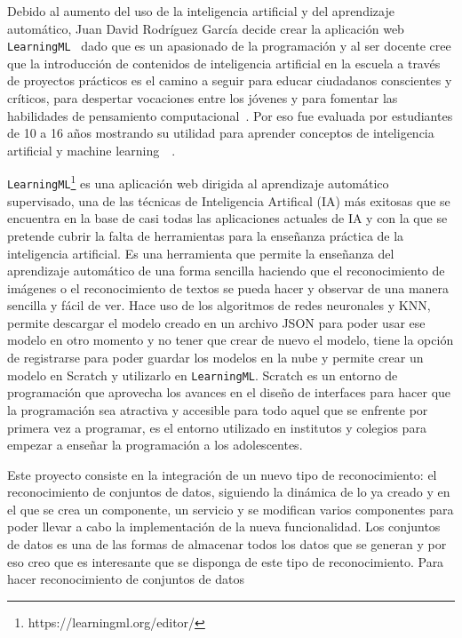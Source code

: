 \documentclass[a4paper, 12pt]{book}
\begin{document}
Debido al aumento del uso de la inteligencia artificial y del aprendizaje automático, Juan David Rodríguez García decide crear la aplicación web \texttt{LearningML}~\cite{garcia2020learningml} dado que es un apasionado de la programación y al ser docente cree  que la introducción de contenidos de inteligencia artificial en la escuela a través de proyectos prácticos es el camino a seguir para educar ciudadanos conscientes y críticos, para despertar vocaciones entre los jóvenes y para fomentar las habilidades de pensamiento computacional~\cite{garcia2019developing}. Por eso fue evaluada por estudiantes de 10 a 16 años mostrando su utilidad para aprender conceptos de inteligencia artificial y machine learning~\cite{Pagina_de_LearningML}~\cite{rodriguez2021evaluation}.

\texttt{LearningML}\footnote{https://learningml.org/editor/} es una aplicación web dirigida al aprendizaje automático supervisado, una de las técnicas de Inteligencia Artifical (IA) más exitosas que se encuentra en la base de casi todas las aplicaciones actuales de IA y con la que se pretende cubrir la falta de herramientas para la enseñanza práctica de la inteligencia artificial. 
Es una herramienta que permite la enseñanza del aprendizaje automático de una forma sencilla haciendo que el reconocimiento de imágenes o el reconocimiento de textos se pueda hacer y observar de una manera sencilla y fácil de ver. 
Hace uso de los algoritmos de redes neuronales y KNN, permite descargar el modelo creado en un archivo JSON para poder usar ese modelo en otro momento y no tener que crear de nuevo el modelo, tiene la opción de registrarse para poder guardar los modelos en la nube y permite crear un modelo en Scratch y utilizarlo en \texttt{LearningML}. Scratch es un entorno de programación que aprovecha los avances en el diseño de interfaces para hacer que la programación sea atractiva y accesible para todo aquel que se enfrente por primera vez a programar, es el entorno utilizado en institutos y colegios para empezar a enseñar la programación a los adolescentes.

Este proyecto consiste en la integración de un nuevo tipo de reconocimiento: el reconocimiento de conjuntos de datos, siguiendo la dinámica de lo ya creado y en el que se crea un componente, un servicio y se modifican varios componentes para poder llevar a cabo la implementación de la nueva funcionalidad. 
Los conjuntos de datos es una de las formas de almacenar todos los datos que se generan y por eso creo que es interesante que se disponga de este tipo de reconocimiento. Para hacer reconocimiento de conjuntos de datos 
\end{document}
